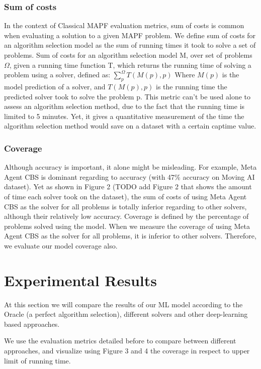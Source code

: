 \documentclass[letterpaper]{article} %
\begin{document}
\subsubsection{Sum of costs}
In the context of Classical MAPF evaluation metrics, sum of costs is common when evaluating a solution to a given MAPF problem. 
We define sum of costs for an algorithm selection model as the sum of running times it took to solve a set of problems. 
Sum of costs for an algorithm selection model M, over set of problems $\Omega$, given a running time function T, which returns the running time of solving a problem using a solver, defined as:\medskip
$\sum_{p}^{\Omega} T(M(p), p)$
Where $M(p)$ is the model prediction of a solver, and $T(M(p),p)$ is the running time the predicted solver took to solve the problem p.
This metric can't be used alone to assess an algorithm selection method, due to the fact that the running time is limited to 5 minutes. Yet, it gives a quantitative measurement of the time the algorithm selection method would save on a dataset with a certain captime value.

\subsubsection{Coverage}
Although accuracy is important, it alone might be misleading. For example, Meta Agent CBS is dominant regarding to accuracy (with 47\% accuracy on Moving AI dataset). Yet as shown in Figure 2 (TODO add Figure 2 that shows the amount of time each solver took on the dataset), the sum of costs of using Meta Agent CBS as the solver for all problems is totally inferior regarding to other solvers, although their relatively low accuracy. 
Coverage is defined by the percentage of problems solved using the model. When we measure the coverage of using Meta Agent CBS as the solver for all problems, it is inferior to other solvers.
Therefore, we evaluate our model coverage also. 


\section{Experimental Results}
At this section we will compare the results of our ML model according to the Oracle (a perfect algorithm selection), different solvers and other deep-learning based approaches.

We use the evaluation metrics detailed before to compare between different approaches, and visualize using Figure 3 and 4 the coverage in respect to upper limit of running time.
\end{document}
